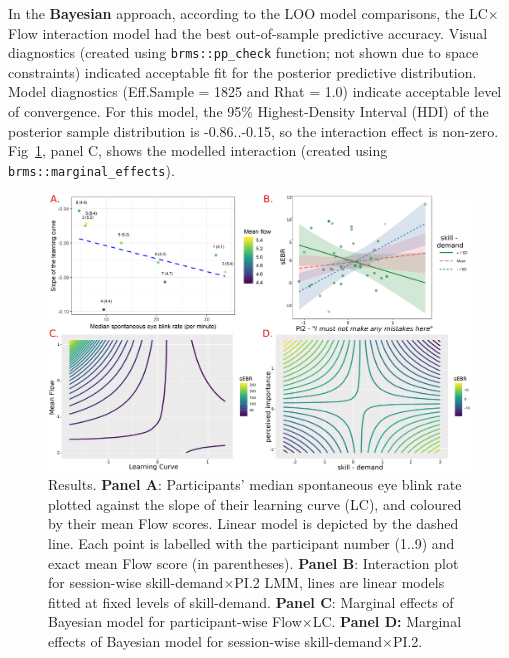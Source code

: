 \documentclass[10pt,letterpaper,floatsintext]{article}
\begin{document}
In the \textbf{Bayesian} approach, according to the LOO model comparisons, the LC$\times$Flow interaction model had the best out-of-sample predictive accuracy. Visual diagnostics (created using \verb|brms::pp_check| function; not shown due to space constraints) indicated acceptable fit for the posterior predictive distribution. Model diagnostics (Eff.Sample = 1825 and Rhat = 1.0) indicate acceptable level of convergence. For this model, the 95\% Highest-Density Interval (HDI) of the posterior sample distribution is -0.86..-0.15, so the interaction effect is non-zero. Fig~\ref{fig:EBRvLC}, panel C, shows the modelled interaction (created using \verb|brms::marginal_effects|).


\begin{figure}[!t]
	\centering
	\includegraphics[width=\textwidth]{sEBR_RQ1-2_results}
	\caption{Results. \textbf{Panel A}: Participants' median spontaneous eye blink rate plotted against the slope of their learning curve (LC), and coloured by their mean Flow scores. Linear model is depicted by the dashed line. Each point is labelled with the participant number (1..9) and exact mean Flow score (in parentheses). \textbf{Panel B}: Interaction plot for session-wise skill-demand$\times$PI.2 LMM, lines are linear models fitted at fixed levels of skill-demand. \textbf{Panel C}: Marginal effects of Bayesian model for participant-wise Flow$\times$LC. \textbf{Panel D:} Marginal effects of Bayesian model for session-wise skill-demand$\times$PI.2.}
	\label{fig:EBRvLC}
\end{figure}
\end{document}
